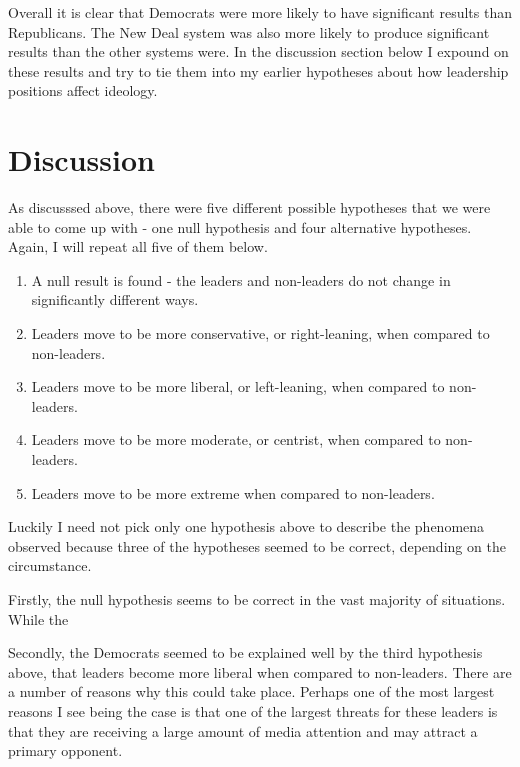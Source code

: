 \documentclass[12pt,twoside]{reedthesis}
\providecommand{\tightlist}{%
  \setlength{\itemsep}{0pt}\setlength{\parskip}{0pt}}
\begin{document}
  Overall it is clear that Democrats were more likely to have significant
  results than Republicans. The New Deal system was also more likely to
  produce significant results than the other systems were. In the
  discussion section below I expound on these results and try to tie them
  into my earlier hypotheses about how leadership positions affect
  ideology.
  
  \chapter{Discussion}\label{discussion}
  
  As discusssed above, there were five different possible hypotheses that
  we were able to come up with - one null hypothesis and four alternative
  hypotheses. Again, I will repeat all five of them below.
  
  \begin{enumerate}
  \def\labelenumi{\arabic{enumi}.}
  \tightlist
  \item
    A null result is found - the leaders and non-leaders do not change in
    significantly different ways.
  \item
    Leaders move to be more conservative, or right-leaning, when compared
    to non-leaders.
  \item
    Leaders move to be more liberal, or left-leaning, when compared to
    non-leaders.
  \item
    Leaders move to be more moderate, or centrist, when compared to
    non-leaders.
  \item
    Leaders move to be more extreme when compared to non-leaders.
  \end{enumerate}
  
  Luckily I need not pick only one hypothesis above to describe the
  phenomena observed because three of the hypotheses seemed to be correct,
  depending on the circumstance.
  
  Firstly, the null hypothesis seems to be correct in the vast majority of
  situations. While the
  
  Secondly, the Democrats seemed to be explained well by the third
  hypothesis above, that leaders become more liberal when compared to
  non-leaders. There are a number of reasons why this could take place.
  Perhaps one of the most largest reasons I see being the case is that one
  of the largest threats for these leaders is that they are receiving a
  large amount of media attention and may attract a primary opponent.
  
\end{document}
